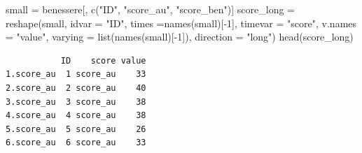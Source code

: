 \documentclass[
  ignorenonframetext,
]{beamer}
\newenvironment{Shaded}{\begin{snugshade}}{\end{snugshade}}
\newcommand{\AttributeTok}[1]{\textcolor[rgb]{0.00,0.34,0.68}{#1}}
\newcommand{\DecValTok}[1]{\textcolor[rgb]{0.69,0.50,0.00}{#1}}
\newcommand{\FunctionTok}[1]{\textcolor[rgb]{0.39,0.29,0.61}{#1}}
\newcommand{\NormalTok}[1]{\textcolor[rgb]{0.12,0.11,0.11}{#1}}
\newcommand{\OtherTok}[1]{\textcolor[rgb]{0.00,0.43,0.16}{#1}}
\newcommand{\SpecialCharTok}[1]{\textcolor[rgb]{0.24,0.68,0.91}{#1}}
\newcommand{\StringTok}[1]{\textcolor[rgb]{0.75,0.01,0.01}{#1}}
\begin{document}
\begin{frame}[fragile]{}
\protect\hypertarget{section-7}{}
\begin{Shaded}
\begin{Highlighting}[]
\NormalTok{small }\OtherTok{=}\NormalTok{ benessere[, }\FunctionTok{c}\NormalTok{(}\StringTok{"ID"}\NormalTok{, }\StringTok{"score\_au"}\NormalTok{, }\StringTok{"score\_ben"}\NormalTok{)]}
\NormalTok{score\_long  }\OtherTok{=} \FunctionTok{reshape}\NormalTok{(small, }
        \AttributeTok{idvar =} \StringTok{"ID"}\NormalTok{, }
        \AttributeTok{times =}\FunctionTok{names}\NormalTok{(small)[}\SpecialCharTok{{-}}\DecValTok{1}\NormalTok{], }
        \AttributeTok{timevar =} \StringTok{"score"}\NormalTok{, }\AttributeTok{v.names =} \StringTok{"value"}\NormalTok{,}
        \AttributeTok{varying =} \FunctionTok{list}\NormalTok{(}\FunctionTok{names}\NormalTok{(small)[}\SpecialCharTok{{-}}\DecValTok{1}\NormalTok{]), }
        \AttributeTok{direction =} \StringTok{"long"}\NormalTok{)}
\FunctionTok{head}\NormalTok{(score\_long)}
\end{Highlighting}
\end{Shaded}

\begin{verbatim}
           ID    score value
1.score_au  1 score_au    33
2.score_au  2 score_au    40
3.score_au  3 score_au    38
4.score_au  4 score_au    38
5.score_au  5 score_au    26
6.score_au  6 score_au    33
\end{verbatim}
\end{frame}
\end{document}
